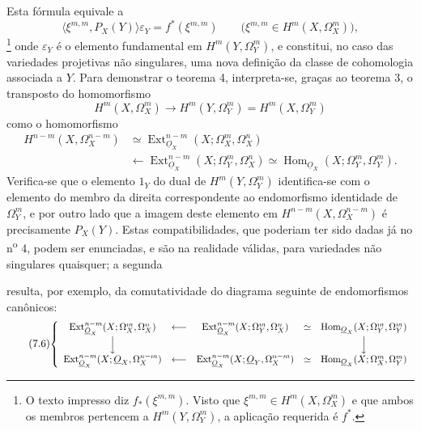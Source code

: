 \documentclass[11pt,twoside,openany]{book}
\numberwithin{equation}{section}
\newcommand{\src}[1]{%
  \phantomsection\hypertarget{src:#1}{}%
  \marginpar{\raggedleft\footnotesize\sffamily #1}%
}
\newcommand{\Osh}{\underline{O}}
\theoremstyle{plain}
\theoremstyle{definition}
\theoremstyle{remark}
\newcommand{\FgaUnitKey}{frontmatter}
\renewcommand{\src}[1]{%
  \phantomsection\hypertarget{src:\FgaUnitKey:#1}{}%
  \marginpar{\raggedleft\footnotesize\sffamily #1}%
}
\begin{document}
Esta fórmula equivale a
\begin{equation}\tag{7.4 bis}
  \bigl\langle\xi^{m,m},P_X(Y)\bigr\rangle\varepsilon_Y
  =f^{*}(\xi^{m,m})
  \qquad
  \bigl(\xi^{m,m}\in H^{m}(X,\Omega_X^{m})\bigr),
\end{equation}
\footnote{O texto impresso diz $f_{*}(\xi^{m,m})$. Visto que
$\xi^{m,m}\in H^{m}(X,\Omega_X^{m})$ e que ambos os membros pertencem a
$H^{m}(Y,\Omega_Y^{m})$, a aplicação requerida é $f^{*}$.} onde
$\varepsilon_Y$ é o elemento fundamental em $H^{m}(Y,\Omega_Y^{m})$, e
constitui, no caso das variedades projetivas não singulares, uma nova
definição da classe de cohomologia associada a $Y$. Para demonstrar o
teorema 4, interpreta-se, graças ao teorema 3, o transposto do homomorfismo
\[
  H^{m}(X,\Omega_X^{m})
  \longrightarrow H^{m}(Y,\Omega_Y^{m})
  =H^{m}(X,\Omega_Y^{m})
\]
como o homomorfismo
\begin{equation}\tag{7.5}
\begin{split}
  H^{n-m}(X,\Omega_X^{n-m})
  &\simeq
  \operatorname{Ext}_{\Osh_X}^{n-m}(X;\Omega_X^{m},\Omega_X^{n})\\
  &\longleftarrow
  \operatorname{Ext}_{\Osh_X}^{n-m}(X;\Omega_Y^{m},\Omega_X^{n})
  \simeq
  \operatorname{Hom}_{\Osh_X}(X;\Omega_Y^{m},\Omega_Y^{m}).
\end{split}
\end{equation}
Verifica-se que o elemento $1_Y$ do dual de $H^{m}(Y,\Omega_Y^{m})$ identifica-se
com o elemento do membro da direita correspondente ao endomorfismo identidade de
$\Omega_Y^{m}$, e por outro lado que a imagem deste elemento em
$H^{n-m}(X,\Omega_X^{n-m})$ é precisamente $P_X(Y)$. Estas compatibilidades, que poderiam
ter sido dadas já no n\textsuperscript{o} 4, podem ser enunciadas, e são
na realidade válidas, para variedades não singulares quaisquer; a segunda

\src{189}
resulta, por exemplo, da comutatividade do diagrama seguinte de endomorfismos
canônicos:
\begin{equation}\tag{7.6}
\resizebox{\textwidth}{!}{$
\left\{
\begin{array}{ccccc}
\operatorname{Ext}_{\Osh_X}^{n-m}(X;\Omega_X^{m},\Omega_X^{n})
&\longleftarrow&
\operatorname{Ext}_{\Osh_X}^{n-m}(X;\Omega_Y^{m},\Omega_X^{n})
&\simeq&
\operatorname{Hom}_{\Osh_X}(X;\Omega_Y^{m},\Omega_Y^{m})\\[3pt]
\Big\downarrow&&&&\Big\downarrow\\[3pt]
\operatorname{Ext}_{\Osh_X}^{n-m}(X;\Osh_X,\Omega_X^{n-m})
&\longleftarrow&
\operatorname{Ext}_{\Osh_X}^{n-m}(X;\Osh_Y,\Omega_X^{n-m})
&\simeq&
\operatorname{Hom}_{\Osh_X}(X;\Omega_X^{m},\Omega_Y^{m})
\end{array}
\right.
$}
\end{equation}
\end{document}
